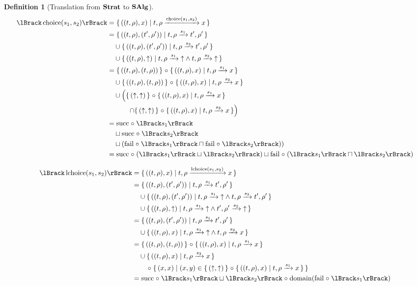 \documentclass{article}
\newtheorem{definition}[theorem]{Definition}
\begin{document}
\begin{definition}[Translation from $\mathbf{Strat}$ to $\mathbf{SAlg}$]
\begin{align*}
  \sem{\choice{s_1}{s_2}}
     &= \setbuild{((t,\rho),x)}{\transformx{t}{\rho}{\choice{s_1}{s_2}}{x}} \\
     &= \setbuild{((t,\rho),(t',\rho'))}{\transform{t}{\rho}{s_1}{t'}{\rho'}} \\
     &\quad \cup {\setbuild{((t,\rho),(t',\rho'))}{\transform{t}{\rho}{s_2}{t'}{\rho'}}} \\
     &\quad \cup {\setbuild{((t,\rho),\fail)}{\transformfail{t}{\rho}{s_1} \land \transformfail{t}{\rho}{s_2}}} \\
     &= \setbuildc{((t,\rho),(t,\rho))} \comp {\setbuild{((t,\rho),x)}{\transformx{t}{\rho}{s_1}{x}}} \\
     &\quad \cup \setbuildc{((t,\rho),(t,\rho))} \comp {\setbuild{((t,\rho),x)}{\transformx{t}{\rho}{s_2}{x}}} \\
     &\quad \cup \left(\setbuildc{(\fail,\fail)} \comp {\setbuild{((t,\rho),x)}{\transformx{t}{\rho}{s_1}{x}}} \right. \\
     &\qquad\quad \left. \cap \setbuildc{(\fail,\fail)} \comp {\setbuild{((t,\rho),x)}{\transformx{t}{\rho}{s_2}{x}}} \right) \\
     &= \lsucc \comp \sem{s_1} \\
     &\quad \sqcup \lsucc \comp \sem{s_2} \\
     &\quad \sqcup \left(\lfail \comp \sem{s_1} \sqcap \lfail \comp \sem{s_2}) \right) \\
     &= \lsucc \comp (\sem{s_1} \sqcup \sem{s_2}) \sqcup \lfail \comp (\sem{s_1} \sqcap \sem{s_2})
\end{align*}

\begin{align*}
  \sem{\leftchoice{s_1}{s_2}}
     &= {\setbuild{((t,\rho),x)}{\transformx{t}{\rho}{\leftchoice{s_1}{s_2}}{x}}} \\
     &= {\setbuild{((t,\rho),(t',\rho'))}{\transform{t}{\rho}{s_1}{t'}{\rho'}}} \\
     &\quad \cup {\setbuild{((t,\rho),(t',\rho'))}{\transformfail{t}{\rho}{s_1} \land \transform{t}{\rho}{s_2}{t'}{\rho'}}} \\
     &\quad \cup {\setbuild{((t,\rho),\fail)}{\transformfail{t}{\rho}{s_1} \land \transformfail{t'}{\rho'}{s_2}}} \\
     &= {\setbuild{((t,\rho),(t',\rho'))}{\transform{t}{\rho}{s_1}{t'}{\rho'}}} \\
     &\quad \cup {\setbuild{((t,\rho),x)}{\transformfail{t}{\rho}{s_1} \land \transformx{t}{\rho}{s_2}{x}}} \\
     &= {\setbuildc{((t,\rho),(t,\rho))}} \comp {\setbuild{((t,\rho),x)}{\transformx{t}{\rho}{s_1}{x}}} \\
     & \quad \cup {\setbuild{((t,\rho),x)}{\transformx{t}{\rho}{s_2}{x}}} \\
     &\qquad \comp \setbuild{ (x,x) } { (x,y) \in \setbuildc{(\fail,\fail)} \comp \setbuild{((t,\rho),x)}{\transformx{t}{\rho}{s_1}{x}} } \\
     &= \lsucc \comp \sem{s_1} \sqcup \sem{s_2} \comp \domain (\lfail \comp \sem{s_1})
\end{align*}


\end{definition}
\end{document}
